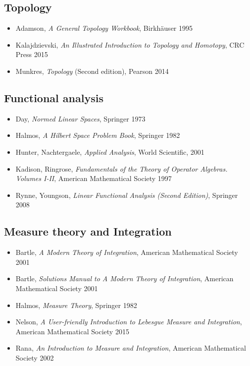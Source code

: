 \subsection*{Topology}

\begin{itemize}
\item Adamson, \textit{A General Topology Workbook}, Birkh\"auser 1995
\item Kalajdzievski, \textit{An Illustrated Introduction to Topology and Homotopy}, CRC Press 2015
\item Munkres, \textit{Topology} (Second edition), Pearson 2014
\end{itemize}


\subsection*{Functional analysis}

\begin{itemize}
Aliprantis, Burkinshaw, \textit{Principles of Real Analysis (Third Edition)}, Academic Press 1998
Aliprantis, Burkinshaw, \textit{Problems in Real Analysis: A Workbook with Solutions}, Academic Press 1998
\item Day, \textit{Normed Linear Spaces}, Springer 1973
\item Halmos, \textit{A Hilbert Space Problem Book}, Springer 1982
\item Hunter, Nachtergaele, \textit{Applied Analysis}, World Scientific, 2001
\item Kadison, Ringrose, \textit{Fundamentals of the Theory of Operator Algebras. Volumes I-II}, American Mathematical Society 1997
\item Rynne, Youngson, \textit{Linear Functional Analysis (Second Edition)}, Springer 2008
\end{itemize}


\subsection*{Measure theory and Integration}

\begin{itemize}
\item Bartle, \textit{A Modern Theory of Integration}, American Mathematical Society 2001
\item Bartle, \textit{Solutions Manual to A Modern Theory of Integration}, American Mathematical Society 2001
\item Halmos, \textit{Measure Theory}, Springer 1982
\item Nelson, \textit{A User-friendly Introduction to Lebesgue Measure and Integration}, American Mathematical Society 2015
\item Rana, \textit{An Introduction to Measure and Integration}, American Mathematical Society 2002
\end{itemize}





